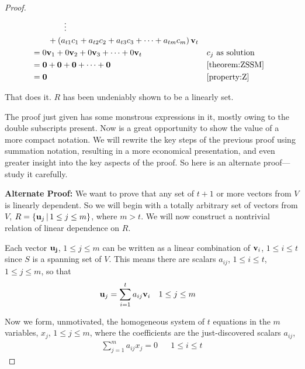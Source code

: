 \documentclass{ximera}
\begin{document}
\begin{theorem}
\begin{proof}
\begin{align*}
    &\quad\quad\quad\quad\vdots\\
    &\quad\quad+\left(a_{t1}c_{1}+a_{t2}c_{2}+a_{t3}c_{3}+\cdots+a_{tm}c_{m}\right)\mathbf{v}_t\\
    &=0\mathbf{v}_1+0\mathbf{v}_2+0\mathbf{v}_3+\cdots+0\mathbf{v}_t
    &&\text{$c_j$ as solution}\\
    &=\mathbf{0}+\mathbf{0}+\mathbf{0}+\cdots+\mathbf{0}
    &&\ref{theorem:ZSSM}\\
    &=\mathbf{0}
    &&\ref{property:Z}
  \end{align*}

  That does it.  $R$ has been undeniably shown to be a linearly
   set.

  The proof just given has some monstrous expressions in it, mostly
  owing to the double subscripts present.  Now is a great opportunity
  to show the value of a more compact notation.  We will rewrite the
  key steps of the previous proof using summation notation, resulting
  in a more economical presentation, and even greater insight into the
  key aspects of the proof.  So here is an alternate proof---study it
  carefully.

  \textbf{Alternate Proof:} We want to prove that any set of $t+1$ or
  more vectors from $V$ is linearly dependent.  So we will begin with
  a totally arbitrary set of vectors from $V$,
  $R=\left\lbrace\mathbf{u}_j\,\middle|\,1\leq j\leq m\right\rbrace$, where $m>t$.  We will now
  construct a nontrivial relation of linear dependence on $R$.

  Each vector $\mathbf{u_j}$, $1\leq j\leq m$ can be written as a linear
  combination of $\mathbf{v}_i$, $1\leq i\leq t$ since $S$ is a spanning
  set of $V$.  This means there are scalars $a_{ij}$, $1\leq i\leq t$,
  $1\leq j\leq m$, so that
  \begin{align*}
    \mathbf{u}_j&=\sum_{i=1}^{t}a_{ij}\mathbf{v}_i&&1\leq j\leq m
  \end{align*}

  Now we form, unmotivated, the homogeneous system of $t$ equations in
  the $m$ variables, $x_j$, $1\leq j\leq m$, where the coefficients
  are the just-discovered scalars $a_{ij}$,
  \begin{align*}
    \sum_{j=1}^{m}a_{ij}x_j=0&&1\leq i\leq t
  \end{align*}
  

\end{proof}
\end{theorem}
\end{document}
